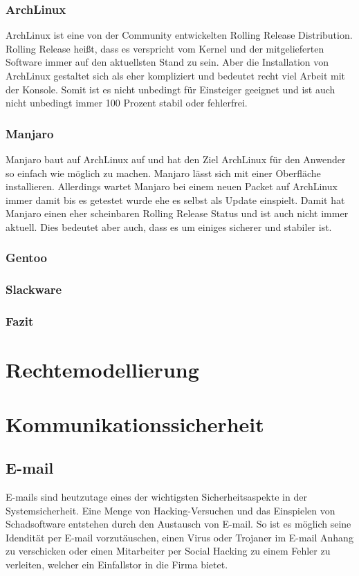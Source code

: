 \documentclass[fontsize=12pt]{scrreprt}
\begin{document}
	\subsection{ArchLinux}
	ArchLinux ist eine von der Community entwickelten Rolling Release Distribution. Rolling Release heißt, dass es verspricht vom Kernel und der mitgelieferten Software immer auf den aktuellsten Stand zu sein. Aber die Installation von ArchLinux gestaltet sich als eher kompliziert und bedeutet recht viel Arbeit mit der Konsole. Somit ist es nicht unbedingt für Einsteiger geeignet und ist auch nicht unbedingt immer 100 Prozent stabil oder fehlerfrei. 
	\subsection{Manjaro}
	Manjaro baut auf ArchLinux auf und hat den Ziel ArchLinux für den Anwender so einfach wie möglich zu machen. Manjaro lässt sich mit einer Oberfläche installieren. Allerdings wartet Manjaro bei einem neuen Packet auf ArchLinux immer damit bis es getestet wurde ehe es selbst als Update einspielt. Damit hat Manjaro einen eher scheinbaren Rolling Release Status und ist auch nicht immer aktuell. Dies bedeutet aber auch, dass es um einiges sicherer und stabiler ist.
	\subsection{Gentoo}
	\subsection{Slackware}
	\subsection{Fazit}
	\chapter{Rechtemodellierung}
	\chapter{Kommunikationssicherheit}
	\section{E-mail}
	E-mails sind heutzutage eines der wichtigsten Sicherheitsaspekte in der Systemsicherheit. Eine Menge von Hacking-Versuchen und das Einspielen von Schadsoftware entstehen durch den Austausch von E-mail. So ist es möglich seine Idendität per E-mail vorzutäuschen, einen Virus oder Trojaner im E-mail Anhang zu verschicken oder einen Mitarbeiter per Social Hacking zu einem Fehler zu verleiten, welcher ein Einfallstor in die Firma bietet.
\end{document}
